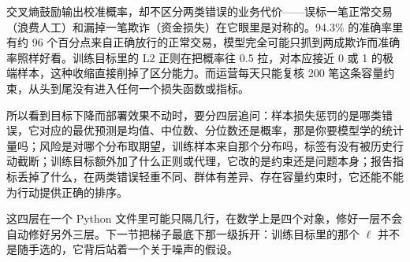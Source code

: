 交叉熵鼓励输出校准概率，却不区分两类错误的业务代价——误标一笔正常交易（浪费人工）和漏掉一笔欺诈（资金损失）在它眼里是对称的。94.3\% 的准确率里有约 96 个百分点来自正确放行的正常交易，模型完全可能只抓到两成欺诈而准确率照样好看。训练目标里的 L2 正则在把概率往 0.5 拉，对本应接近 0 或 1 的极端样本，这种收缩直接削掉了区分能力。而运营每天只能复核 200 笔这条容量约束，从头到尾没有进入任何一个损失函数或指标。

所以看到目标下降而部署效果不动时，要分四层追问：样本损失惩罚的是哪类错误，它对应的最优预测是均值、中位数、分位数还是概率，那是你要模型学的统计量吗；风险是对哪个分布取期望，训练样本来自那个分布吗，标签有没有被历史行动截断；训练目标额外加了什么正则或代理，它改的是约束还是问题本身；报告指标丢掉了什么，在两类错误轻重不同、群体有差异、存在容量约束时，它还能不能为行动提供正确的排序。

这四层在一个 Python 文件里可能只隔几行，在数学上是四个对象，修好一层不会自动修好另外三层。下一节把梯子最底下那一级拆开：训练目标里的那个 \(\ell\) 并不是随手选的，它背后站着一个关于噪声的假设。

